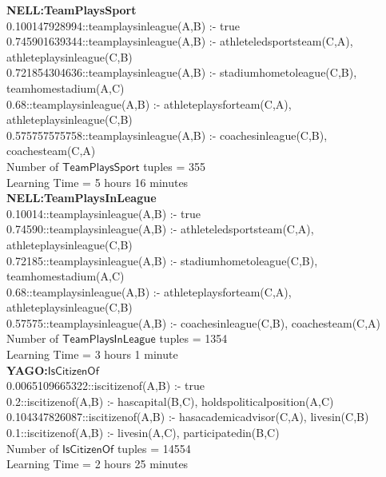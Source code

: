 \documentclass[akbc,twoside,11pt]{article}
\begin{document}
\begin{footnotesize}
\noindent \textbf{NELL:TeamPlaysSport}  \\
0.100147928994::teamplaysinleague(A,B) :- true \\
0.745901639344::teamplaysinleague(A,B) :- athleteledsportsteam(C,A), athleteplaysinleague(C,B) \\
0.721854304636::teamplaysinleague(A,B) :- stadiumhometoleague(C,B), teamhomestadium(A,C) \\
0.68::teamplaysinleague(A,B) :- athleteplaysforteam(C,A), athleteplaysinleague(C,B) \\
0.575757575758::teamplaysinleague(A,B) :- coachesinleague(C,B), coachesteam(C,A) \\
Number of $\mathsf{TeamPlaysSport}$ tuples = 355 \\
Learning Time = 5 hours 16 minutes \\ %

\noindent \textbf{NELL:TeamPlaysInLeague} \\
0.10014::teamplaysinleague(A,B) :- true \\
0.74590::teamplaysinleague(A,B) :- athleteledsportsteam(C,A), athleteplaysinleague(C,B) \\
0.72185::teamplaysinleague(A,B) :- stadiumhometoleague(C,B), teamhomestadium(A,C) \\
0.68::teamplaysinleague(A,B) :- athleteplaysforteam(C,A), athleteplaysinleague(C,B) \\
0.57575::teamplaysinleague(A,B) :- coachesinleague(C,B), coachesteam(C,A) \\
Number of $\mathsf{TeamPlaysInLeague}$ tuples = 1354 \\
Learning Time = 3 hours 1 minute \\ %

\noindent \textbf{YAGO:$\mathsf{IsCitizenOf}$} \\
0.0065109665322::iscitizenof(A,B) :- true \\
0.2::iscitizenof(A,B) :- hascapital(B,C), holdspoliticalposition(A,C) \\
0.104347826087::iscitizenof(A,B) :- hasacademicadvisor(C,A), livesin(C,B) \\
0.1::iscitizenof(A,B) :- livesin(A,C), participatedin(B,C) \\
Number of $\mathsf{IsCitizenOf}$ tuples = 14554 \\
Learning Time = 2 hours 25 minutes \\ %

\end{footnotesize}
\end{document}
